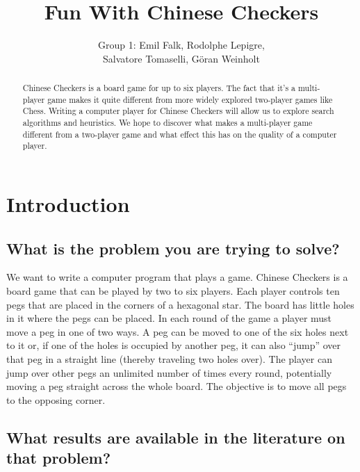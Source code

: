 \documentclass[a4paper,11pt]{article}
\begin{document}
\title{Fun With Chinese Checkers}
\author{Group 1: Emil Falk, Rodolphe Lepigre, \\ Salvatore Tomaselli, G\"oran Weinholt}
\maketitle
\begin{abstract}
Chinese Checkers is a board game for up to six players. The fact that
it's a multi-player game makes it quite different from more widely
explored two-player games like Chess. Writing a computer player for
Chinese Checkers will allow us to explore search algorithms and
heuristics. We hope to discover what makes a multi-player game
different from a two-player game and what effect this has on the
quality of a computer player.
\end{abstract}

\section{Introduction}
\subsection{What is the problem you are trying to solve?}

We want to write a computer program that plays a game. Chinese
Checkers is a board game that can be played by two to six players.
Each player controls ten pegs that are placed in the corners of a
hexagonal star. The board has little holes in it where the pegs can be
placed. In each round of the game a player must move a peg in one of
two ways. A peg can be moved to one of the six holes next to it or, if
one of the holes is occupied by another peg, it can also ``jump'' over
that peg in a straight line (thereby traveling two holes over). The
player can jump over other pegs an unlimited number of times every
round, potentially moving a peg straight across the whole board. The
objective is to move all pegs to the opposing corner.

\subsection{What results are available in the literature on that problem?}
\end{document}
